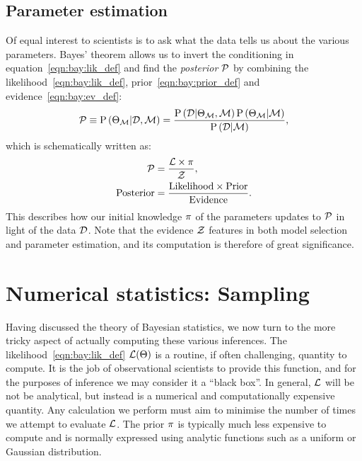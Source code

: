 \subsection{Parameter estimation}
Of equal interest to scientists is to ask what the data tells us about the various parameters.  
Bayes' theorem allows us to invert the conditioning in equation~\eqref{eqn:bay:lik_def} and find the {\em posterior\/} $\mathcal{P}$ by combining the likelihood~\eqref{eqn:bay:lik_def}, prior~\eqref{eqn:bay:prior_def} and evidence~\eqref{eqn:bay:ev_def}:
%
\begin{equation}
  \mathcal{P}\equiv
  \mathrm{P}\left(\Theta_{\mathcal{M}}\middle|\mathcal{D},\mathcal{M}\right) = \frac{\mathrm{P}\left(\mathcal{D}\middle|\Theta_{\mathcal{M}},\mathcal{M}\right) \mathrm{P}\left(\Theta_{\mathcal{M}}\middle|\mathcal{M}\right)}{\mathrm{P}\left(\mathcal{D}\middle|\mathcal{M}\right)},
  \label{eqn:bay:bayes_theorem}
\end{equation}
%
which is schematically written as:
\begin{align}
  \mathcal{P} &= \frac{\mathcal{L} \times \pi }{\mathcal{Z} },
  \label{eqn:bay:bayes_theorem_abbrv}\\
  \mathrm{Posterior} &= \frac{\mathrm{Likelihood} \times \mathrm{Prior} }{\mathrm{Evidence} }.
\end{align}
This describes how our initial knowledge $\pi$ of the parameters updates to $\mathcal{P}$ in light of the data $\mathcal{D}$. Note that the evidence $\mathcal{Z}$ features in both model selection and parameter estimation, and its computation is therefore of great significance.







\section{Numerical statistics: Sampling}
\label{sec:bay:samp}
Having discussed the theory of Bayesian statistics, we now turn to the more tricky aspect of actually computing these various inferences. The likelihood~\eqref{eqn:bay:lik_def} $\mathcal{L}(\Theta)$ is a routine, if often challenging, quantity to compute. It is the job of observational scientists to provide this function, and for the purposes of inference we may consider it a ``black box''. In general, $\mathcal{L}$ will be not be analytical, but instead is a numerical and computationally expensive quantity. Any calculation we perform must aim to minimise the number of times we attempt to evaluate $\mathcal{L}$. The prior $\pi$ is typically much less expensive to compute and is normally expressed using analytic functions such as a uniform or Gaussian distribution.

